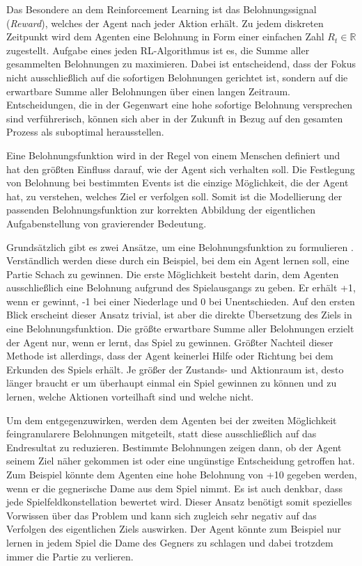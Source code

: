 Das Besondere an dem Reinforcement Learning ist das Belohnungssignal (\textit{Reward}), welches der Agent nach jeder Aktion erhält. Zu jedem diskreten Zeitpunkt wird dem Agenten eine Belohnung in Form einer einfachen Zahl $R_t \in \mathbb{R}$ zugestellt. Aufgabe eines jeden RL-Algorithmus ist es, die Summe aller gesammelten Belohnungen zu maximieren. Dabei ist entscheidend, dass der Fokus nicht ausschließlich auf die sofortigen Belohnungen gerichtet ist, sondern auf die erwartbare Summe aller Belohnungen über einen langen Zeitraum. Entscheidungen, die in der Gegenwart eine hohe sofortige Belohnung versprechen sind verführerisch, können sich aber in der Zukunft in Bezug auf den gesamten Prozess als suboptimal herausstellen. \cite[~S.53]{Sutton1998}
\par 
Eine Belohnungsfunktion wird in der Regel von einem Menschen definiert und hat den größten Einfluss darauf, wie der Agent sich verhalten soll. Die Festlegung von Belohnung bei bestimmten Events ist die einzige Möglichkeit, die der Agent hat, zu verstehen, welches Ziel er verfolgen soll. Somit ist die Modellierung der passenden Belohnungsfunktion zur korrekten Abbildung der eigentlichen Aufgabenstellung von gravierender Bedeutung.
\par 
Grundsätzlich gibt es zwei Ansätze, um eine Belohnungsfunktion zu formulieren \cite[S.~469f.]{Sutton1998}. Verständlich werden diese durch ein Beispiel, bei dem ein Agent lernen soll, eine Partie Schach zu gewinnen. Die erste Möglichkeit besteht darin, dem Agenten ausschließlich eine Belohnung aufgrund des Spielausgangs zu geben. Er erhält +1, wenn er gewinnt, -1 bei einer Niederlage und 0 bei Unentschieden. Auf den ersten Blick erscheint dieser Ansatz trivial, ist aber die direkte Übersetzung des Ziels in eine Belohnungsfunktion. Die größte erwartbare Summe aller Belohnungen erzielt der Agent nur, wenn er lernt, das Spiel zu gewinnen. Größter Nachteil dieser Methode ist allerdings, dass der Agent keinerlei Hilfe oder Richtung bei dem Erkunden des Spiels erhält. Je größer der Zustands- und Aktionraum ist, desto länger braucht er um überhaupt einmal ein Spiel gewinnen zu können und zu lernen, welche Aktionen vorteilhaft sind und welche nicht.
\par 
Um dem entgegenzuwirken, werden dem Agenten bei der zweiten Möglichkeit feingranularere Belohnungen mitgeteilt, statt diese ausschließlich auf das Endresultat zu reduzieren. Bestimmte Belohnungen zeigen dann, ob der Agent seinem Ziel näher gekommen ist oder eine ungünstige Entscheidung getroffen hat. Zum Beispiel könnte dem Agenten eine hohe Belohnung von +10 gegeben werden, wenn er die gegnerische Dame aus dem Spiel nimmt. Es ist auch denkbar, dass jede Spielfeldkonstellation bewertet wird. Dieser Ansatz benötigt somit spezielles Vorwissen über das Problem und kann sich zugleich sehr negativ auf das Verfolgen des eigentlichen Ziels auswirken. Der Agent könnte zum Beispiel nur lernen in jedem Spiel die Dame des Gegners zu schlagen und dabei trotzdem immer die Partie zu verlieren.
